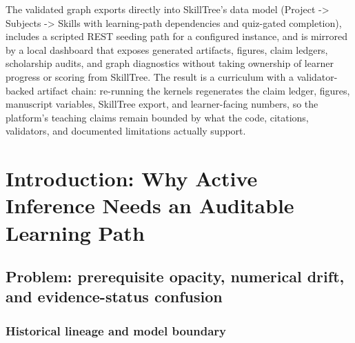 \documentclass[
  english,
]{article}
\begin{document}
The validated graph exports directly into SkillTree's data model
(Project -\textgreater{} Subjects -\textgreater{} Skills with
learning-path dependencies and quiz-gated completion), includes a
scripted REST seeding path for a configured instance, and is mirrored by
a local dashboard that exposes generated artifacts, figures, claim
ledgers, scholarship audits, and graph diagnostics without taking
ownership of learner progress or scoring from SkillTree. The result is a
curriculum with a validator-backed artifact chain: re-running the
kernels regenerates the claim ledger, figures, manuscript variables,
SkillTree export, and learner-facing numbers, so the platform's teaching
claims remain bounded by what the code, citations, validators, and
documented limitations actually support.

\newpage

\section{Introduction: Why Active Inference Needs an Auditable Learning
Path}\label{introduction-why-active-inference-needs-an-auditable-learning-path}

\subsection{Problem: prerequisite opacity, numerical drift, and
evidence-status
confusion}\label{problem-prerequisite-opacity-numerical-drift-and-evidence-status-confusion}

\subsubsection{Historical lineage and model
boundary}\label{historical-lineage-and-model-boundary}
\end{document}
